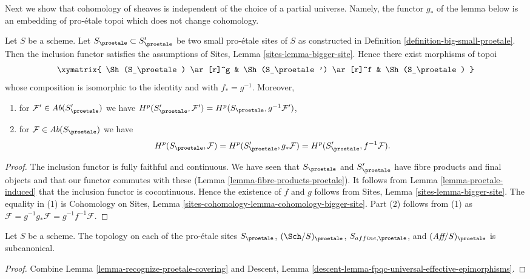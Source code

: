 \noindent
Next we show that cohomology of sheaves is independent of the choice
of a partial universe. Namely, the functor $g_*$ of the lemma below
is an embedding of pro-\'etale topoi which does not change cohomology.

\begin{lemma}
\label{lemma-proetale-cohomology-independent-partial-universe}
Let $S$ be a scheme. Let $S_\proetale \subset S_\proetale'$ be
two small pro-\'etale sites of $S$ as constructed in
Definition \ref{definition-big-small-proetale}. Then the inclusion functor
satisfies the assumptions of 
Sites, Lemma \ref{sites-lemma-bigger-site}.
Hence there exist morphisms of topoi
$$
\xymatrix{
\Sh(S_\proetale) \ar[r]^g &
\Sh(S_\proetale') \ar[r]^f &
\Sh(S_\proetale)
}
$$
whose composition is isomorphic to the identity and with $f_* = g^{-1}$.
Moreover,
\begin{enumerate}
\item for $\mathcal{F}' \in \textit{Ab}(S_\proetale')$ we have
$H^p(S_\proetale', \mathcal{F}') = H^p(S_\proetale, g^{-1}\mathcal{F}')$,
\item for $\mathcal{F} \in \textit{Ab}(S_\proetale)$ we have
$$
H^p(S_\proetale, \mathcal{F}) =
H^p(S_\proetale', g_*\mathcal{F}) =
H^p(S_\proetale', f^{-1}\mathcal{F}).
$$
\end{enumerate}
\end{lemma}

\begin{proof}
The inclusion functor is fully faithful and continuous.
We have seen that $S_\proetale$ and $S_\proetale'$ have fibre products
and final objects and that our functor commutes with these
(Lemma \ref{lemma-fibre-products-proetale}).
It follows from Lemma \ref{lemma-proetale-induced}
that the inclusion functor is cocontinuous.
Hence the existence of $f$ and $g$ follows from
Sites, Lemma \ref{sites-lemma-bigger-site}.
The equality in (1) is
Cohomology on Sites, Lemma \ref{sites-cohomology-lemma-cohomology-bigger-site}.
Part (2) follows from (1) as
$\mathcal{F} = g^{-1}g_*\mathcal{F} = g^{-1}f^{-1}\mathcal{F}$.
\end{proof}

\begin{lemma}
\label{lemma-proetale-subcanonical}
Let $S$ be a scheme. The topology on each of the pro-\'etale sites
$S_\proetale$, $(\Sch/S)_\proetale$, $S_{affine, \proetale}$, and
$(\textit{Aff}/S)_\proetale$ is subcanonical.
\end{lemma}

\begin{proof}
Combine Lemma \ref{lemma-recognize-proetale-covering} and
Descent, Lemma \ref{descent-lemma-fpqc-universal-effective-epimorphisms}.
\end{proof}

